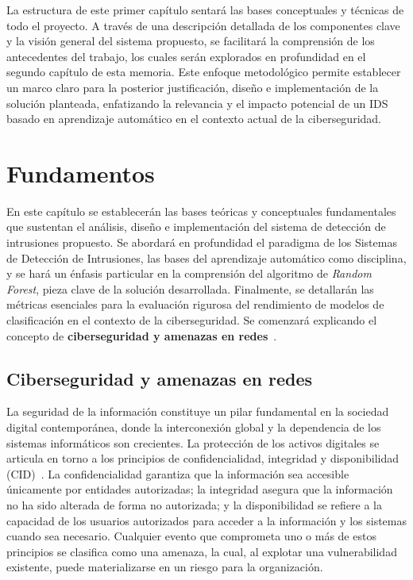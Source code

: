 La estructura de este primer capítulo sentará las bases conceptuales y técnicas de todo el proyecto. A través de una descripción detallada de los componentes clave y la visión general del sistema propuesto, se facilitará la comprensión de los antecedentes del trabajo, los cuales serán explorados en profundidad en el segundo capítulo de esta memoria. Este enfoque metodológico permite establecer un marco claro para la posterior justificación, diseño e implementación de la solución planteada, enfatizando la relevancia y el impacto potencial de un IDS basado en aprendizaje automático en el contexto actual de la ciberseguridad.

\section{Fundamentos}

En este capítulo se establecerán las bases teóricas y conceptuales fundamentales que sustentan el análisis, diseño e implementación del sistema de detección de intrusiones propuesto. Se abordará en profundidad el paradigma de los Sistemas de Detección de Intrusiones, las bases del aprendizaje automático como disciplina, y se hará un énfasis particular en la comprensión del algoritmo de \textit{Random Forest}, pieza clave de la solución desarrollada. Finalmente, se detallarán las métricas esenciales para la evaluación rigurosa del rendimiento de modelos de clasificación en el contexto de la ciberseguridad. Se comenzará explicando el concepto de \textbf{ciberseguridad y amenazas en redes}~\cite{iso27000}.

\subsection{Ciberseguridad y amenazas en redes}

La seguridad de la información constituye un pilar fundamental en la sociedad digital contemporánea, donde la interconexión global y la dependencia de los sistemas informáticos son crecientes. La protección de los activos digitales se articula en torno a los principios de confidencialidad, integridad y disponibilidad (CID)~\cite{iso27000,anderson2020security}. La confidencialidad garantiza que la información sea accesible únicamente por entidades autorizadas; la integridad asegura que la información no ha sido alterada de forma no autorizada; y la disponibilidad se refiere a la capacidad de los usuarios autorizados para acceder a la información y los sistemas cuando sea necesario. Cualquier evento que comprometa uno o más de estos principios se clasifica como una amenaza, la cual, al explotar una vulnerabilidad existente, puede materializarse en un riesgo para la organización.

